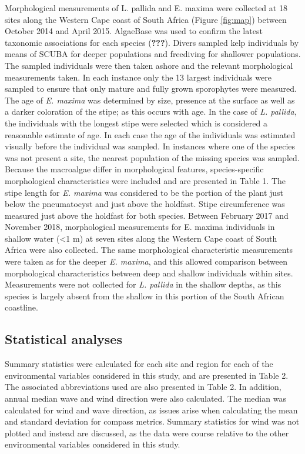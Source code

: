 \documentclass[
  a4paper,
]{article}
\begin{document}
Morphological measurements of L. pallida and E. maxima were collected at
18 sites along the Western Cape coast of South Africa (Figure
\ref{fig:map}) between October 2014 and April 2015. AlgaeBase was used
to confirm the latest taxonomic associations for each species
({\textbf{???}}). Divers sampled kelp individuals by means of SCUBA for
deeper populations and freediving for shallower populations. The sampled
individuals were then taken ashore and the relevant morphological
measurements taken. In each instance only the 13 largest individuals
were sampled to ensure that only mature and fully grown sporophytes were
measured. The age of \emph{E. maxima} was determined by size, presence
at the surface as well as a darker coloration of the stipe; as this
occurs with age. In the case of \emph{L. pallida}, the individuals with
the longest stipe were selected which is considered a reasonable
estimate of age. In each case the age of the individuals was estimated
visually before the individual was sampled. In instances where one of
the species was not present a site, the nearest population of the
missing species was sampled. Because the macroalgae differ in
morphological features, species-specific morphological characteristics
were included and are presented in Table 1. The stipe length for
\emph{E. maxima} was considered to be the portion of the plant just
below the pneumatocyst and just above the holdfast. Stipe circumference
was measured just above the holdfast for both species. Between February
2017 and November 2018, morphological measurements for E. maxima
individuals in shallow water (\textless1 m) at seven sites along the
Western Cape coast of South Africa were also collected. The same
morphological characteristic measurements were taken as for the deeper
\emph{E. maxima}, and this allowed comparison between morphological
characteristics between deep and shallow individuals within sites.
Measurements were not collected for \emph{L. pallida} in the shallow
depths, as this species is largely absent from the shallow in this
portion of the South African coastline.

\hypertarget{statistical-analyses}{%
\subsection{Statistical analyses}\label{statistical-analyses}}

Summary statistics were calculated for each site and region for each of
the environmental variables considered in this study, and are presented
in Table 2. The associated abbreviations used are also presented in
Table 2. In addition, annual median wave and wind direction were also
calculated. The median was calculated for wind and wave direction, as
issues arise when calculating the mean and standard deviation for
compass metrics. Summary statistics for wind was not plotted and instead
are discussed, as the data were course relative to the other
environmental variables considered in this study.
\end{document}
